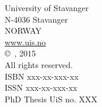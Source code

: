 
{
\vspace*{1.0cm}\noindent
University of Stavanger\\
N-4036 Stavanger\\
NORWAY\\
\textcolor{blue}{\url{www.uis.no}}\\

\vspace{0.2cm}\noindent
\copyright\ \thethesisauthor, 2015\\
All rights reserved.\\

\vspace{0.2cm}\noindent
ISBN  xxx-xx-xxx-xx\\
ISSN  xxx-xx-xxx-xx\\

\vspace{0.2cm}\noindent
PhD Thesis UiS no. XXX
}
\clearpage
